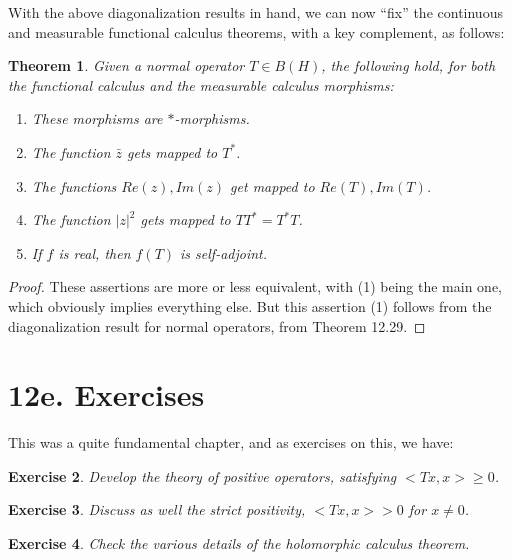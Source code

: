 \documentclass[12pt]{amsbook}
\newtheorem{theorem}{Theorem}[chapter]
\newtheorem{exercise}[theorem]{Exercise}
\begin{document}
With the above diagonalization results in hand, we can now ``fix'' the continuous and measurable functional calculus theorems, with a key complement, as follows:


\begin{theorem}
Given a normal operator $T\in B(H)$, the following hold, for both the functional calculus and the measurable calculus morphisms:
\begin{enumerate}
\item These morphisms are $*$-morphisms.

\item The function $\bar{z}$ gets mapped to $T^*$.

\item The functions $Re(z),Im(z)$ get mapped to $Re(T),Im(T)$.

\item The function $|z|^2$ gets mapped to $TT^*=T^*T$.

\item If $f$ is real, then $f(T)$ is self-adjoint. 
\end{enumerate}
\end{theorem}

\begin{proof}
These assertions are more or less equivalent, with (1) being the main one, which obviously implies everything else. But this assertion (1) follows from the diagonalization result for normal operators, from Theorem 12.29.
\end{proof}

\section*{12e. Exercises}

This was a quite fundamental chapter, and as exercises on this, we have:

\begin{exercise}
Develop the theory of positive operators, satisfying $<Tx,x>\geq0$.
\end{exercise}

\begin{exercise}
Discuss as well the strict positivity, $<Tx,x>>0$ for $x\neq0$.
\end{exercise}

\begin{exercise}
Check the various details of the holomorphic calculus theorem.
\end{exercise}
\end{document}
